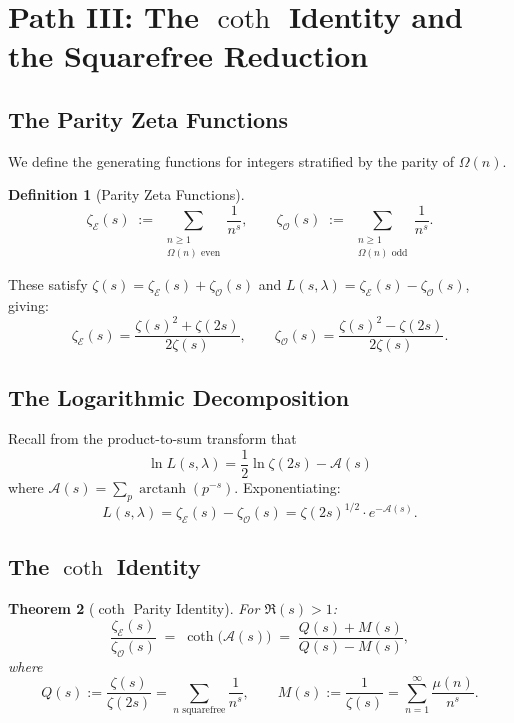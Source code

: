 \documentclass[11pt,a4paper]{article}
\theoremstyle{plain}
\newtheorem{theorem}{Theorem}[section]
\theoremstyle{definition}
\newtheorem{definition}[theorem]{Definition}
\newcommand{\EE}{\mathcal{E}}
\newcommand{\OO}{\mathcal{O}}
\newcommand{\cA}{\mathcal{A}}
\begin{document}
\section{Path III: The $\coth$ Identity and the Squarefree Reduction}

\subsection{The Parity Zeta Functions}

We define the generating functions for integers stratified by the parity of $\Omega(n)$.

\begin{definition}[Parity Zeta Functions]
\begin{equation}\label{eq:parity-zeta}
\zeta_{\EE}(s) \;:=\; \sum_{\substack{n \geq 1 \\ \Omega(n) \text{ even}}} \frac{1}{n^s}, \qquad \zeta_{\OO}(s) \;:=\; \sum_{\substack{n \geq 1 \\ \Omega(n) \text{ odd}}} \frac{1}{n^s}.
\end{equation}
\end{definition}

These satisfy $\zeta(s) = \zeta_{\EE}(s) + \zeta_{\OO}(s)$ and $L(s,\lambda) = \zeta_{\EE}(s) - \zeta_{\OO}(s)$, giving:
\begin{equation}\label{eq:zeta-split}
\zeta_{\EE}(s) = \frac{\zeta(s)^2 + \zeta(2s)}{2\zeta(s)}, \qquad \zeta_{\OO}(s) = \frac{\zeta(s)^2 - \zeta(2s)}{2\zeta(s)}.
\end{equation}

\subsection{The Logarithmic Decomposition}

Recall from the product-to-sum transform that
\[
\ln L(s,\lambda) = \frac{1}{2}\ln\zeta(2s) - \cA(s)
\]
where $\cA(s) = \sum_p \operatorname{arctanh}(p^{-s})$. Exponentiating:
\[
L(s,\lambda) = \zeta_{\EE}(s) - \zeta_{\OO}(s) = \zeta(2s)^{1/2} \cdot e^{-\cA(s)}.
\]

\subsection{The $\coth$ Identity}

\begin{theorem}[$\coth$ Parity Identity]\label{thm:coth}
For $\Re(s) > 1$:
\begin{equation}\label{eq:coth}
\frac{\zeta_{\EE}(s)}{\zeta_{\OO}(s)} \;=\; \coth\bigl(\cA(s)\bigr) \;=\; \frac{Q(s) + M(s)}{Q(s) - M(s)},
\end{equation}
where
\begin{equation}\label{eq:QM}
Q(s) := \frac{\zeta(s)}{\zeta(2s)} = \sum_{n \text{ squarefree}} \frac{1}{n^s}, \qquad M(s) := \frac{1}{\zeta(s)} = \sum_{n=1}^{\infty} \frac{\mu(n)}{n^s}.
\end{equation}
\end{theorem}
\end{document}
